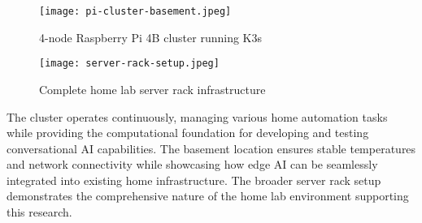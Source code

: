 \documentclass[12pt]{article}
\begin{document}
\begin{figure}[h]
\centering
\begin{minipage}{0.45\textwidth}
\centering
\texttt{[image: pi-cluster-basement.jpeg]}
\caption{4-node Raspberry Pi 4B cluster running K3s}
\label{fig:pi-cluster}
\end{minipage}
\hfill
\begin{minipage}{0.45\textwidth}
\centering
\texttt{[image: server-rack-setup.jpeg]}
\caption{Complete home lab server rack infrastructure}
\label{fig:server-rack}
\end{minipage}
\end{figure}

The cluster operates continuously, managing various home automation tasks while providing the computational foundation for developing and testing conversational AI capabilities. The basement location ensures stable temperatures and network connectivity while showcasing how edge AI can be seamlessly integrated into existing home infrastructure. The broader server rack setup demonstrates the comprehensive nature of the home lab environment supporting this research.



\end{document}
